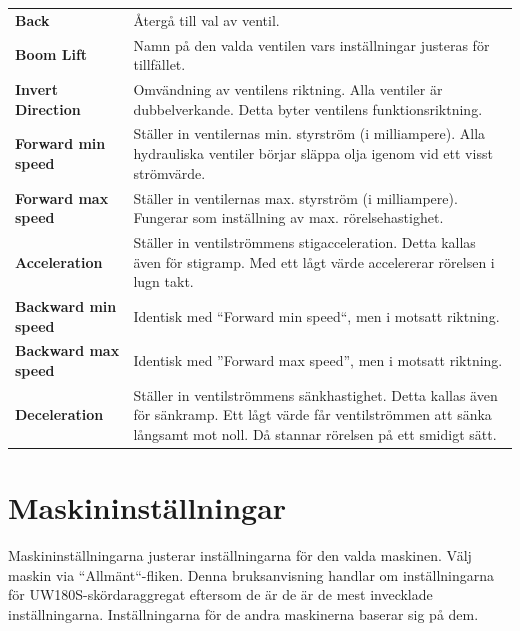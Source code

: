\documentclass[12pt,a4paper,finnish]{uvmanual}
\begin{document}
\begin{tabular}{ L{0.2\textwidth} L{0.66\textwidth} }
\textbf{Back} & Återgå till val av ventil. \\
\textbf{Boom Lift} & Namn på den valda ventilen vars inställningar justeras för tillfället.  \\
\textbf{Invert Direction} & Omvändning av ventilens riktning. Alla ventiler är dubbelverkande. Detta byter ventilens funktionsriktning.  \\
\textbf{Forward min speed} & Ställer in ventilernas min. styrström (i milliampere). Alla hydrauliska ventiler börjar släppa olja igenom vid ett visst strömvärde.  \\
\textbf{Forward max speed} & Ställer in ventilernas max. styrström (i milliampere). Fungerar som inställning av max. rörelsehastighet.  \\
\textbf{Acceleration} & Ställer in ventilströmmens stigacceleration. Detta kallas även för stigramp. Med ett lågt värde accelererar rörelsen i lugn takt.  \\
\textbf{Backward min speed} & Identisk med ``Forward min speed``, men i motsatt riktning.  \\
\textbf{Backward max speed} & Identisk med ''Forward max speed'', men i motsatt riktning. \\
\textbf{Deceleration} & Ställer in ventilströmmens sänkhastighet. Detta kallas även för sänkramp. Ett lågt värde får ventilströmmen att sänka långsamt mot noll. Då stannar rörelsen på ett smidigt sätt.  \\
\end{tabular}



\section{Maskininställningar}\label{ch:settings_implement}

Maskininställningarna justerar inställningarna för den valda maskinen. Välj maskin via ``Allmänt``-fliken. Denna bruksanvisning handlar om inställningarna för UW180S-skördaraggregat eftersom de är de är de mest invecklade inställningarna. Inställningarna för de andra maskinerna baserar sig på dem.
\end{document}

